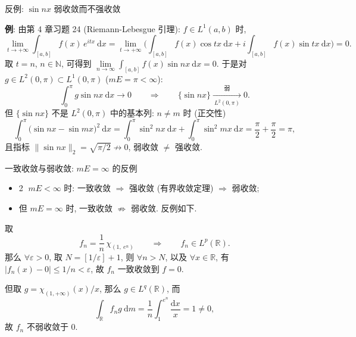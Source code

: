 
\begin{frame}{反例: $\sin nx$ 弱收敛而不强收敛}

\textbf{例}: 由第 4 章习题 24 (\alert{Riemann-Lebesgue 引理}):
$f \in L^1(a,b)$ 时,
\[
\lim_{t \to +\infty} \int_{[a,b]} f(x)\, e^{itx} ~ \mathrm{d} x
= \lim_{t \to +\infty} \Big( \int_{[a,b]} f(x) \cos tx ~ \mathrm{d} x
+ i \int_{[a,b]} f(x) \sin tx ~ \mathrm{d} x \Big) = 0 .
\]
\pause
取 $t = n$, $n \in \mathbb{N}$, 可得到
$\lim\limits_{n \to \infty} \int_{[a,b]} f(x) \sin nx ~ \mathrm{d} x = 0$.
于是对 $g \in L^2(0, \pi) \subset L^1(0, \pi)$ ($mE = \pi < \infty$):
\[
\int_0^{\pi} g \sin nx ~ \mathrm{d} x \longrightarrow 0
\qquad \Longrightarrow \qquad
\{ \sin nx \} \xrightarrow[\ L^2(0, \pi)\ ]{\ \text{弱}\ } 0 .
\]
\pause
但 $\{ \sin nx \}$ \alert{不是 $L^2(0,\pi)$ 中的基本列}: $n \neq m$ 时 (正交性)
\[
\int_0^{\pi} \big( \sin nx - \sin mx \big)^2 ~ \mathrm{d} x
= \int_0^{\pi} \sin^2 nx ~ \mathrm{d} x
+ \int_0^{\pi} \sin^2 mx ~ \mathrm{d} x
= \frac{\pi}{2} + \frac{\pi}{2} = \pi,
\]
且指标 $\lVert \sin nx \rVert_2 = \sqrt{\pi / 2} \not\to 0$, 弱收敛 $\neq$ 强收敛.

\end{frame}


\begin{frame}{一致收敛与弱收敛: $mE = \infty$ 的反例}

\begin{itemize}
\item \textcircled{2} $mE < \infty$ 时: \alert{一致收敛}
  $\Longrightarrow$ \alert{强收敛} (有界收敛定理)
  $\Longrightarrow$ 弱收敛;
\item 但 $mE = \infty$ 时, 一致收敛 $\not\Longrightarrow$ 弱收敛. 反例如下.
\end{itemize}

\pause

\begin{eg}
取
\[
f_n = \frac{1}{n}\, \chi_{(1,\ e^n)}
\qquad \Longrightarrow \qquad
f_n \in L^p(\mathbb{R}) .
\]
那么 $\forall \varepsilon > 0$, 取 $N = [1/\varepsilon] + 1$,
则 $\forall n > N$, 以及 $\forall x \in \mathbb{R}$, 有
$|f_n(x) - 0| \leqslant 1/n < \varepsilon$,
故 $f_n$ \alert{一致收敛}到 $f = 0$.

\pause
但取 $g = \chi_{(1, +\infty)}(x) / x$, 那么 $g \in L^q(\mathbb{R})$, 而
\[
\int_{\mathbb{R}} f_n g ~ \mathrm{d} m
= \frac{1}{n} \int_1^{e^n} \frac{\mathrm{d} x}{x} = 1 \neq 0 ,
\]
故 $f_n$ \alert{不弱收敛}于 $0$.
\end{eg}

\end{frame}

